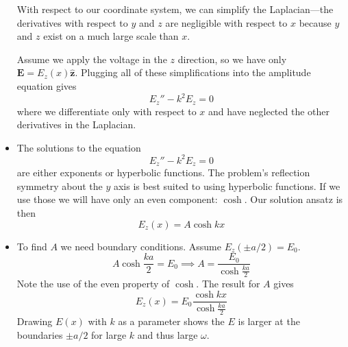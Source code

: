 \documentclass[11pt, a4paper]{article}
\renewcommand{\vec}[1]{\bm{#1}} %
\newcommand{\uvec}[1]{\hat{\vec{#1}}} %
\newcommand{\E}{\vec{E}}  %
\begin{document}
\begin{itemize}
	With respect to our coordinate system, we can simplify the Laplacian---the derivatives with respect to $ y $ and $ z $ are negligible with respect to $ x $ because $ y $ and $ z $ exist on a much large scale than $ x $. 
	
	Assume we apply the voltage in the $ z $ direction, so we have only $ \E = E_{z}(x) \uvec{z} $. Plugging all of these simplifications into the amplitude equation gives
	\begin{equation*}
		E_{z}'' - k^{2}E_{z} = 0
	\end{equation*}
	where we differentiate only with respect to $ x $ and have neglected the other derivatives in the Laplacian. 
	
	\item The solutions to the equation 
	\begin{equation*}
		E_{z}'' - k^{2}E_{z} = 0
	\end{equation*}
	are either exponents or hyperbolic functions. The problem's reflection symmetry about the $ y $ axis is best suited to using hyperbolic functions. If we use those we will have only an even component: $ \cosh $. Our solution ansatz is then
	\begin{equation*}
		E_{z}(x) = A\cosh kx
	\end{equation*}
	
	\item To find $ A $ we need boundary conditions. Assume $ E_{z}(\pm a/2) = E_{0} $. 
	\begin{equation*}
		A \cosh \frac{ka}{2} = E_{0} \implies A = \frac{E_{0}}{\cosh \frac{ka}{2}}
	\end{equation*} 
	Note the use of the even property of $ \cosh $. The result for $ A $ gives
	\begin{equation*}
		E_{z}(x) = E_{0}\frac{\cosh kx}{\cosh \frac{ka}{2}}
	\end{equation*}
	Drawing $ E(x) $ with $ k $ as a parameter shows the $ E $ is larger at the boundaries $ \pm a/2 $ for large $ k $ and thus large $ \omega $. 
	

\end{itemize}
\end{document}
